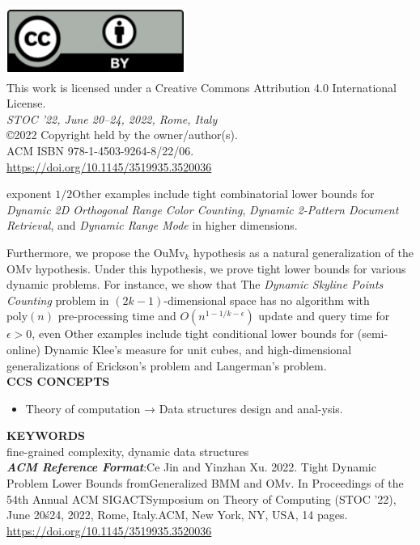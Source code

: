 \documentclass[preprint,10pt]{elsarticle}
\begin{document}
\begin{multicols}{2}
\begin{minipage}[t]{\linewidth}
{    \includegraphics[scale=0.2]{image.png} 
    \\
    This work is licensed under a Creative Commons Attribution 4.0 International License.\\
    \textit{STOC '22, June 20--24, 2022, Rome, Italy}\\
    \copyright 2022 Copyright held by the owner/author(s).\\
    ACM ISBN 978-1-4503-9264-8/22/06.\\
    \href{https://doi.org/10.1145/3519935.3520036}{https://doi.org/10.1145/3519935.3520036}
}
\end{minipage}
      exponent $1/2$Other examples include tight combinatorial lower bounds for \emph{Dynamic 2D Orthogonal Range Color Counting}, \emph{Dynamic 2-Pattern Document Retrieval}, and \emph{Dynamic Range Mode} in higher dimensions.
	
Furthermore, we propose the OuMv$_k$ hypothesis as a natural generalization of the OMv hypothesis. Under this hypothesis, we prove tight lower bounds for various dynamic problems. For instance, we show that The \emph{Dynamic Skyline Points Counting} problem in $(2k-1)$-dimensional space has no algorithm with $\mathrm{poly}(n)$ pre-processing time and $O(n^{1-1/k-\epsilon})$ update and query time for $\epsilon > 0$, even 
Other examples include tight conditional lower bounds for (semi-online) Dynamic Klee's measure for unit cubes, and high-dimensional generalizations of Erickson’s problem and Langerman’s problem.  \\

  \textbf{CCS CONCEPTS}
  \begin{itemize}
      \item Theory of computation → Data structures design and anal-ysis.
  \end{itemize} 
  
  \textbf{KEYWORDS}\\
  fine-grained complexity, dynamic data structures\\
  
  \textbf{\emph{ACM Reference Format}}:Ce Jin and Yinzhan Xu. 2022. Tight Dynamic Problem Lower Bounds fromGeneralized BMM and OMv. In Proceedings of the 54th Annual ACM SIGACTSymposium on Theory of Computing (STOC ’22), June 20ś24, 2022, Rome, Italy.ACM, New York, NY, USA, 14 pages. \url{https://doi.org/10.1145/3519935.3520036}\\


\end{multicols}
\end{document}
